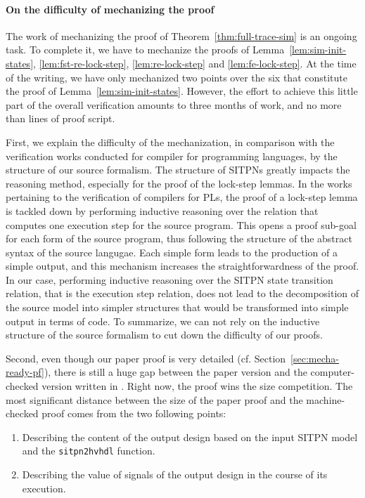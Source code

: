 \documentclass[pdflatex,sn-mathphys]{sn-jnl}%
\theoremstyle{thmstyleone}%
\theoremstyle{thmstyletwo}%
\theoremstyle{thmstylethree}%
\begin{document}
\paragraph{On the difficulty of mechanizing the proof}

The work of mechanizing the proof of Theorem~\ref{thm:full-trace-sim}
is an ongoing task. To complete it, we have to mechanize the proofs of
Lemma~\ref{lem:sim-init-states}, \ref{lem:fst-re-lock-step},
\ref{lem:re-lock-step} and \ref{lem:fe-lock-step}. At the time of the
writing, we have only mechanized two points over the six that
constitute the proof of Lemma~\ref{lem:sim-init-states}. However, the
effort to achieve this little part of the overall verification amounts
to three months of work, and no more than lines of proof
script.

\bigskip

First, we explain the difficulty of the mechanization, in comparison
with the verification works conducted for compiler for programming
languages, by the structure of our source
formalism.  %
The structure of SITPNs greatly impacts the reasoning method,
especially for the proof of the lock-step lemmas. In the works
pertaining to the verification of compilers for PLs, the proof of a
lock-step lemma is tackled down by performing inductive reasoning over
the relation that computes one execution step for the source
program. This opens a proof sub-goal for each form of the source
program, thus following the structure of the abstract syntax of the
source langugae. Each simple form leads to the production of a simple
output, and this mechanism increases the straightforwardness of the
proof. In our case, performing inductive reasoning over the SITPN
state transition relation, that is the execution step relation, does
not lead to the decomposition of the source model into simpler
structures that would be transformed into simple output in terms of
\vhdl{} code. To summarize, we can not rely on the inductive structure
of the source formalism to cut down the difficulty of our proofs.

\bigskip

Second, even though our paper proof is very detailed
(cf. Section~\ref{sec:mecha-ready-pf}), there is still a huge gap
between the paper version and the computer-checked version written in
\coq{}.  Right now, the \coq{} proof wins the size competition. The
most significant distance between the size of the paper proof and the
machine-checked proof comes from the two following points:
\begin{enumerate}
  
\item Describing the content of the output design based on the
  input SITPN model and the \texttt{sitpn2hvhdl} function.
\item Describing the value of signals of the output design in the
  course of its execution.
\end{enumerate}
\end{document}
